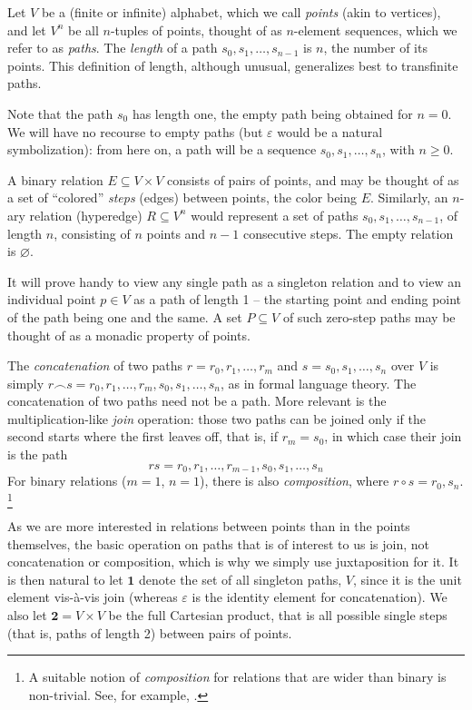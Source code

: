 \documentclass{llncs}
\newcommand{\ABC}{V}
\newcommand{\Pair}{\textbf{2}}
\newcommand{\One}{\textbf{1}}
\begin{document}
Let $\ABC$ be a (finite or infinite) alphabet, which we call
\emph{points} (akin to vertices), and let $\ABC^n$ be all $n$-tuples
of points, thought of as $n$-element sequences, which we refer to as
\emph{paths}.  The \emph{length} of a path $s_0,s_1,\ldots,s_{n-1}$ is
$n$, the number of its points.  This definition of
length, although unusual, generalizes best to transfinite paths.

Note that the path $s_0$ has length
one, the empty path being obtained for $n=0$.  We
will have no recourse to empty paths (but $\varepsilon$ would be a
natural symbolization): from here on, a path will be a sequence $s_0,
s_1, \ldots, s_n$, with $n\geq 0$.

A binary relation $E\subseteq\ABC\times\ABC$ consists of pairs of
points, and may be thought of as a set of ``colored'' \emph{steps}
(edges) between points, the color being $E$.  Similarly, an $n$-ary
relation (hyperedge) $R\subseteq \ABC^n$ would represent a set of
paths $s_0,s_1,\ldots,s_{n-1}$, of length $n$, consisting of $n$
points and $n-1$ consecutive steps.  The empty relation is
$\varnothing$.

It will prove handy to view any single path as a singleton relation
and to view an individual point $p\in\ABC$ as a path of length 1 -- the
starting point and ending point of the path being one and the same.  A
set $P\subseteq\ABC$ of such zero-step paths may be thought of as a
monadic property of points. 


The \emph{concatenation} of two paths $r=r_0,r_1,\ldots,r_m$ and
$s=s_0,s_1,\ldots,s_n$ over $\ABC$ is simply $r\smallfrown
s=r_0,r_1,\ldots,r_m,s_0,s_1,\ldots,s_n$, as in formal language
theory. The concatenation of two paths need not be a path. More
relevant is the multiplication-like \emph{join} operation: those two
paths can be joined only if the second starts where the first leaves
off, that is, if $r_m=s_0$, in which case their join is the path
\[
r s = r_0,r_1,\ldots,r_{m-1},s_0,s_1,\ldots,s_n
\]
For binary relations ($m=1$, $n=1$), there is also \emph{composition},
where $r\circ s= r_0,s_n$.%
\footnote{A suitable notion of \emph{composition} for relations that
  are wider than binary is non-trivial.  See, for example, \cite{Marx}.}

As we are more interested in relations between points than in the
points themselves, the basic operation on paths that is of interest to
us is join, not concatenation or composition, which is why we simply
use juxtaposition for it.  It is then natural to let $\One$ denote the
set of all singleton paths, $\ABC$, since it is the unit element
vis-\`a-vis join (whereas $\varepsilon$ is the identity element for
concatenation).  We also let $\Pair=\ABC\times\ABC$ be the full
Cartesian product, that is all possible single steps (that is, paths of
length 2) between pairs of points.
\end{document}

